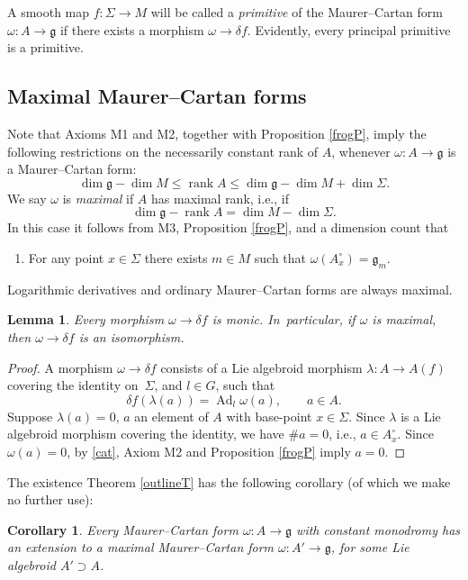 \documentclass[11pt]{article}
\numberwithin{equation}{section}
\numberwithin{equation}{section}
\newtheorem{Corollary}[Theorem]{Corollary}
\newtheorem{Lemma}[Theorem]{Lemma}
\DeclareMathOperator{\rank}{rank} \DeclareMathOperator{\image}{im}
\DeclareMathOperator{\Adjoint}{Ad}
\DeclareMathOperator{\dimension}{dim}
\renewcommand{\le}{\leqslant}
\begin{document}
A smooth map $f \colon \Sigma \rightarrow M$ will be called a {\it primitive} of the Maurer--Cartan form
$\omega \colon A \rightarrow {\mathfrak g} $ if there exists a
morphism $\omega \rightarrow \delta f$. Evidently, every principal
primitive is a primitive.

\subsection*{Maximal Maurer--Cartan forms}%

Note that Axioms M1 and M2, together with Proposition \ref{frogP},
imply the following restrictions on the necessarily constant rank of
$A$, whenever $\omega \colon A \rightarrow {\mathfrak g} $ is a
Maurer--Cartan form:
\begin{equation*}
\dimension {\mathfrak g} -\dimension M\le \rank A
\le \dimension {\mathfrak g} -\dimension M + \dimension \Sigma.
\end{equation*}
We say $\omega $ is {\it maximal} if $A$ has maximal
rank, i.e., if
\[
\dim {\mathfrak g}-\rank A = \dimension M - \dimension \Sigma.
\]
In
this case it follows from M3, Proposition \ref{frogP}, and a dimension
count that
\begin{enumerate}\itemsep=0pt
\item[M3$'$.] For any point $x \in \Sigma $ there exists $m \in M$
such that $\omega(A^\circ_x) = {\mathfrak g}_m$.
\end{enumerate} Logarithmic derivatives and ordinary Maurer--Cartan
forms are always maximal.
%
\begin{Lemma}%
 Every morphism $\omega \rightarrow \delta f$ is monic. In~particular, if $\omega $ is maximal, then
 $\omega \rightarrow \delta f$ is an isomorphism.
\end{Lemma}

\begin{proof} A morphism $\omega \rightarrow \delta f$ consists of a
Lie algebroid morphism $\lambda \colon A \rightarrow A(f)$ covering
the identity on~$\Sigma$, and $l \in G$, such that
 \begin{equation}
 \delta f (\lambda(a))=\Adjoint_l \omega(a), \qquad a \in A.\label{cat}
 \end{equation}
 Suppose $\lambda(a)=0$, $a$ an element of $A $ with
base-point $x \in \Sigma $. Since $\lambda$ is a Lie algebroid
morphism covering the identity, we have $\# a =0$, i.e., $a \in
A^\circ_x$. Since $\omega(a)=0$, by \eqref{cat}, Axiom M2 and
Proposition \ref{frogP} imply $a=0$.
\end{proof}
%
The existence Theorem \ref{outlineT} has the following corollary (of
which we make no further use):
\begin{Corollary}%
 Every Maurer--Cartan form
 $\omega \colon A \rightarrow {\mathfrak g} $ with constant monodromy
 has an extension to a maximal Maurer--Cartan form
 $\omega \colon A' \rightarrow {\mathfrak g} $, for some Lie
 algebroid $A' \supset A$.
\end{Corollary}
\end{document}
